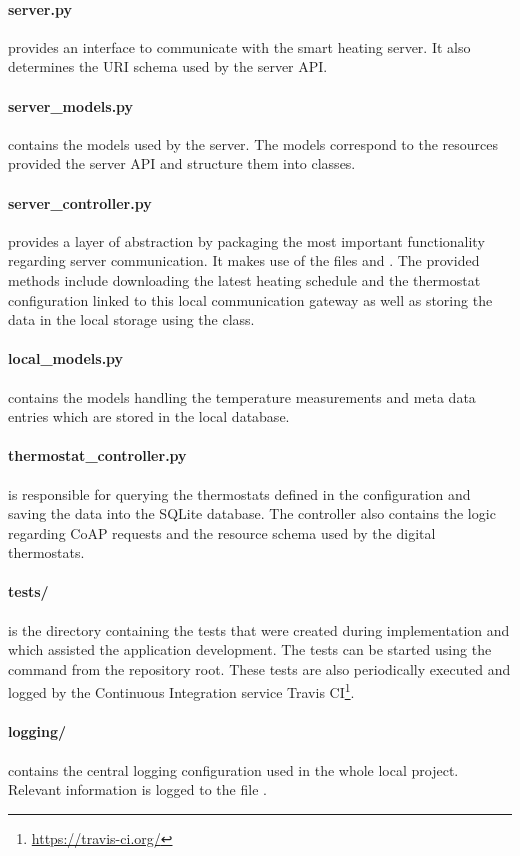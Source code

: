 \paragraph{server.py} provides an interface to communicate with the smart heating server.
It also determines the URI schema used by the server API.

\paragraph{server\_models.py} contains the models used by the server.
The models correspond to the resources provided the server API and structure them into classes.

\paragraph{server\_controller.py} provides a layer of abstraction by packaging the most important functionality regarding server communication.
It makes use of the files  and .
The provided methods include downloading the latest heating schedule and the thermostat configuration linked to this local communication gateway as well as storing the data in the local storage using the  class.

\paragraph{local\_models.py} contains the models handling the temperature measurements and meta data entries which are stored in the local database.

\paragraph{thermostat\_controller.py} is responsible for querying the thermostats defined in the configuration and saving the data into the SQLite database.
The controller also contains the logic regarding CoAP requests and the resource schema used by the digital thermostats.

\paragraph{tests/} is the directory containing the tests that were created during implementation and which assisted the application development.
The tests can be started using the command  from the repository root.
These tests are also periodically executed and logged by the Continuous Integration service Travis CI\footnote{\url{https://travis-ci.org/}}.

\paragraph{logging/} contains the central logging configuration used in the whole local project.
Relevant information is logged to the file .






